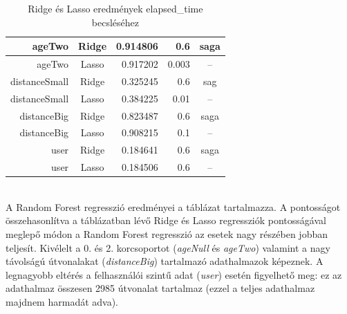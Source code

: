 \begin{table}[h!]
\begin{tabular}{|r|c|r|r|c|}
		ageTwo        & Ridge           & 0.914806                                & 0.6                                    & saga            \\ \hline
		ageTwo        & Lasso           & 0.917202                                & 0.003                                  & --              \\ \hline
		distanceSmall & Ridge           & 0.325245                                & 0.6                                    & sag             \\ \hline
		distanceSmall & Lasso           & 0.384225                                & 0.01                                   & --              \\ \hline
		distanceBig   & Ridge           & 0.823487                                & 0.6                                    & saga            \\ \hline
		distanceBig   & Lasso           & 0.908215                                & 0.1                                    & --              \\ \hline
		user   & Ridge           & 0.184641                                & 0.6                                    & saga            \\ \hline
		user   & Lasso           & 0.184506                                & 0.6                                    & --              \\ \hline
	\end{tabular}
	\caption{Ridge és Lasso eredmények elapsed\_time becsléséhez}
	\label{table:elapsedTimeRidgeAndLasso}
\end{table}\\[6pt]

\noindent A Random Forest regresszió eredményei a  táblázat tartalmazza. A pontosságot összehasonlítva a  táblázatban lévő Ridge és Lasso regressziók pontosságával meglepő módon a Random Forest regresszió az esetek nagy részében jobban teljesít. Kivélelt a 0. és 2. korcsoportot (\textit{ageNull} és \textit{ageTwo}) valamint a nagy távolságú útvonalakat (\textit{distanceBig}) tartalmazó adathalmazok képeznek. A legnagyobb eltérés a felhasználói szintű adat (\textit{user}) esetén figyelhető meg: ez az adathalmaz összesen 2985 útvonalat tartalmaz (ezzel a teljes adathalmaz majdnem harmadát adva).

